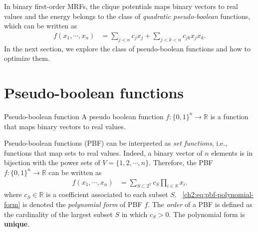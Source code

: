 

In binary first-order MRFs, the clique potentials maps binary vectors to real values and the energy belongs to the class of \emph{quadratic pseudo-boolean} functions, which can be written as
\begin{align*}
	f(x_1,\cdots, x_n) &= \sum_{j < n}{c_jx_j} + \sum_{j<k<n}{c_{jk}x_jx_k}.
\end{align*} 
%
In the next section, we explore the class of pseudo-boolean functions and how to optimize them.

\section{Pseudo-boolean functions}
\label{ch2:sec:pseudo-boolean-functions}

\begin{definition}{Pseudo-boolean function}
	A pseudo boolean function $f:\{0,1\}^n \rightarrow \mathbb{R}$ is a function that maps binary vectors to real values.
\end{definition}

Pseudo-boolean functions (PBF) can be interpreted as \emph{set functions}, i.e., functions that map sets to real values. Indeed, a binary vector of $n$ elements is in bijection with the power sets of $V = \{1,2,\cdots,n\}$. Therefore, the PBF $f:\{0,1\}^n \rightarrow \mathbb{R}$ can be written as
\begin{align}
	f(x_1,\cdots,x_n) &= \sum_{S \subset 2^{V}}{c_S \prod_{i \in S}{x_i}}.
	\label{ch2:eq:pbf-polynomial-form}
\end{align}
%
where $c_S \in \mathbb{R}$ is a coefficient associated to each subset $S$. ~\cref{ch2:eq:pbf-polynomial-form} is denoted the \emph{polynomial form} of PBF $f$. The \emph{order} of a PBF is defined as the cardinality of the largest subset $S$ in which $c_S>0$. The polynomial form is \textbf{unique}. 


